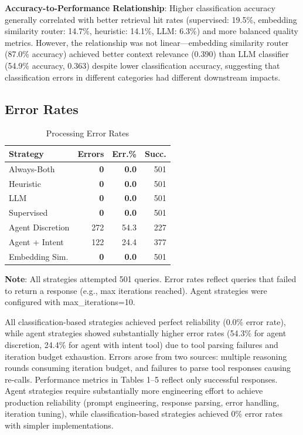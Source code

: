 \documentclass[twocolumn,10pt]{article}
\begin{document}
\textbf{Accuracy-to-Performance Relationship}: Higher classification accuracy generally correlated with better retrieval hit rates (supervised: 19.5\%, embedding similarity router: 14.7\%, heuristic: 14.1\%, LLM: 6.3\%) and more balanced quality metrics. However, the relationship was not linear---embedding similarity router (87.0\% accuracy) achieved better context relevance (0.390) than LLM classifier (54.9\% accuracy, 0.363) despite lower classification accuracy, suggesting that classification errors in different categories had different downstream impacts.

\subsection{Error Rates}

\begin{table}[h]
\centering
\caption{Processing Error Rates}
\footnotesize
\begin{tabular}{lrrr}
\toprule
Strategy & Errors & Err.\% & Succ. \\
\midrule
Always-Both & \textbf{0} & \textbf{0.0} & 501 \\
Heuristic & \textbf{0} & \textbf{0.0} & 501 \\
LLM & \textbf{0} & \textbf{0.0} & 501 \\
Supervised & \textbf{0} & \textbf{0.0} & 501 \\
Agent Discretion & 272 & 54.3 & 227 \\
Agent + Intent & 122 & 24.4 & 377 \\
Embedding Sim. & \textbf{0} & \textbf{0.0} & 501 \\
\bottomrule
\end{tabular}
\end{table}

\textbf{Note}: All strategies attempted 501 queries. Error rates reflect queries that failed to return a response (e.g., max iterations reached). Agent strategies were configured with max\_iterations=10.

All classification-based strategies achieved perfect reliability (0.0\% error rate), while agent strategies showed substantially higher error rates (54.3\% for agent discretion, 24.4\% for agent with intent tool) due to tool parsing failures and iteration budget exhaustion. Errors arose from two sources: multiple reasoning rounds consuming iteration budget, and failures to parse tool responses causing re-calls. Performance metrics in Tables 1--5 reflect only successful responses. Agent strategies require substantially more engineering effort to achieve production reliability (prompt engineering, response parsing, error handling, iteration tuning), while classification-based strategies achieved 0\% error rates with simpler implementations.
\end{document}
